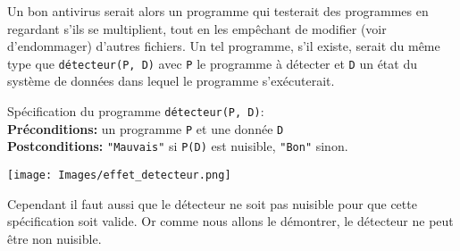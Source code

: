 Un bon antivirus serait alors un programme qui testerait des programmes en regardant s'ils se multiplient, tout en les empêchant de modifier (voir d'endommager) d'autres fichiers. Un tel programme, s'il existe, serait du même type que \lstinline|détecteur(P, D)| avec \lstinline|P| le programme à détecter et \lstinline|D| un état du système de données dans lequel le programme s'exécuterait.

\noindent Spécification du programme \lstinline|détecteur(P, D)|:\\
\textbf{Préconditions:} un programme \lstinline|P| et une donnée \lstinline|D|\\
\textbf{Postconditions:} \lstinline|"Mauvais"| si \lstinline|P(D)| est nuisible, \lstinline|"Bon"| sinon.

\begin{center}
	\texttt{[image: Images/effet\_detecteur.png]}
\end{center}

Cependant il faut aussi que le détecteur ne soit pas nuisible pour que cette spécification soit valide. Or comme nous allons le démontrer, le détecteur ne peut être non nuisible.

